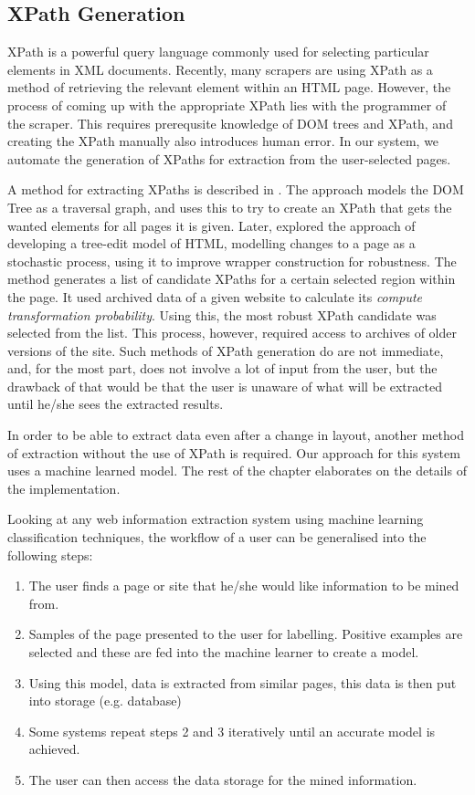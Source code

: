 \subsection{XPath Generation}
	XPath is a powerful query language commonly used for selecting particular elements in XML documents. Recently, many scrapers are using XPath as a method of retrieving the relevant element within an HTML page. However, the process of coming up with the appropriate XPath lies with the programmer of the scraper. This requires prerequsite knowledge of DOM trees and XPath, and creating the XPath manually also introduces human error. In our system, we automate the generation of XPaths for extraction from the user-selected pages.
	
	A method for extracting XPaths is described in \cite{Anton2004}. The approach models the DOM Tree as a traversal graph, and uses this to try to create an XPath that gets the wanted elements for all pages it is given.  Later, \cite{Dalvi2009} explored the approach of developing a tree-edit model of HTML, modelling changes to a page as a stochastic process, using it to improve wrapper construction for robustness. The method generates a list of candidate XPaths for a certain selected region within the page. It used archived data of a given website to calculate its \textit{compute transformation probability}. Using this, the most robust XPath candidate was selected from the list. This process, however, required access to archives of older versions of the site. Such methods of XPath generation do are not immediate, and, for the most part, does not involve a lot of input from the user, but the drawback of that would be that the user is unaware of what will be extracted until he/she sees the extracted results.







In order to be able to extract data even after a change in layout, another method of extraction without the use of XPath is required. Our approach for this system uses a machine learned model. The rest of the chapter elaborates on the details of the implementation.

	
Looking at any web information extraction system using machine learning classification techniques, the workflow of a user can be generalised into the following steps:
\begin{enumerate}
	\item The user finds a page or site that he/she would like information to be mined from.
	\item Samples of the page presented to the user for labelling. Positive examples are selected and these are fed into the machine learner to create a model.
	\item Using this model, data is extracted from similar pages, this data is then put into storage (e.g. database)
	\item Some systems repeat steps 2 and 3 iteratively until an accurate model is achieved.
	\item The user can then access the data storage for the mined information.
\end{enumerate}